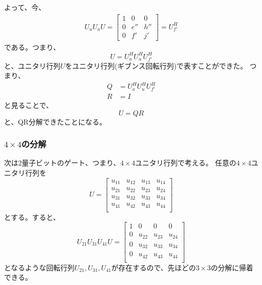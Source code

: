 よって、今、
\begin{align}
  U_u U_a U =
  \begin{bmatrix}
    1 & 0   & 0   \\
    0 & e'' & h'' \\
    0 & f'  & j'
  \end{bmatrix}
  = U_{f'}^H
\end{align}
である。つまり、
\begin{equation}
  U = U_a^H U_u^H U_{f'}^H
\end{equation}
と、ユニタリ行列$U$をユニタリ行列(ギブンス回転行列)で表すことができた。
つまり、
\begin{align}
  Q &= U_a^H U_u^H U_{f'}^H \\
  R &= I
\end{align}
と見ることで、
\begin{equation}
  U = QR
\end{equation}
と、QR分解できたことになる。

\subsubsection{$4\times 4$の分解}
次は2量子ビットのゲート、つまり、$4\times 4$ユニタリ行列で考える。
任意の$4\times 4$ユニタリ行列を
\begin{equation}
  U =
    \begin{bmatrix}
      u_{11} & u_{12} & u_{13} & u_{14} \\
      u_{21} & u_{22} & u_{23} & u_{24} \\
      u_{31} & u_{32} & u_{33} & u_{34} \\
      u_{41} & u_{42} & u_{43} & u_{44} \\
    \end{bmatrix}
\end{equation}
とする。すると、
\begin{equation}
  U_{21}U_{31}U_{41}U =
  \begin{bmatrix}
    1 & 0      & 0      & 0      \\
    0 & u_{22} & u_{23} & u_{24} \\
    0 & u_{32} & u_{33} & u_{34} \\
    0 & u_{42} & u_{43} & u_{44} \\
  \end{bmatrix}
\end{equation}
となるような回転行列$U_{21},U_{31},U_{41}$が存在するので、先ほどの$3\times 3$の分解に帰着できる。

